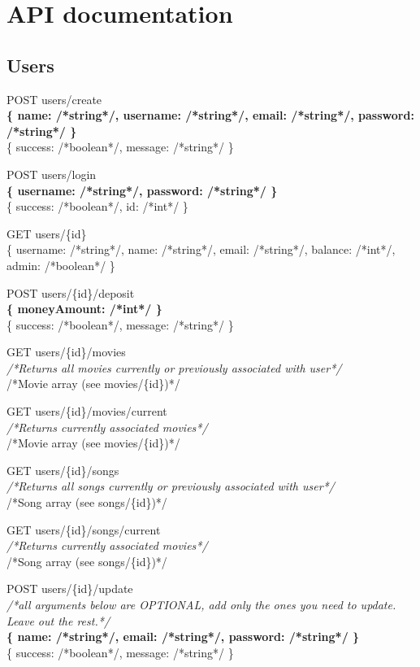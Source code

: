 \section{API documentation}
\label{app:apidoc}

\subsection{Users}

POST users/create\\
\textbf{\{ name: /*string*/, username: /*string*/, email: /*string*/, password: /*string*/ \}}\\
\{ success: /*boolean*/, message: /*string*/ \}

POST users/login\\
\textbf{\{ username: /*string*/, password: /*string*/ \}}\\
\{ success: /*boolean*/, id: /*int*/ \}

GET  users/\{id\}\\
\{ username: /*string*/, name: /*string*/, email: /*string*/, balance: /*int*/, admin: /*boolean*/ \}

POST users/\{id\}/deposit\\
\textbf{\{ moneyAmount: /*int*/ \}}\\
\{ success: /*boolean*/, message: /*string*/ \}

GET  users/\{id\}/movies\\
\emph{/*Returns all movies currently or previously associated with user*/}\\
/*Movie array (see movies/\{id\})*/

GET  users/\{id\}/movies/current\\
\emph{/*Returns currently associated movies*/}\\
/*Movie array (see movies/\{id\})*/

GET  users/\{id\}/songs\\
\emph{/*Returns all songs currently or previously associated with user*/}\\
/*Song array (see songs/\{id\})*/

GET  users/\{id\}/songs/current\\
\emph{/*Returns currently associated movies*/}\\
/*Song array (see songs/\{id\})*/

POST users/\{id\}/update\\
\emph{/*all arguments below are OPTIONAL, add only the ones you need to update. Leave out the rest.*/}\\
\textbf{\{ name: /*string*/, email: /*string*/, password: /*string*/ \}\\}
\{ success: /*boolean*/, message: /*string*/ \}

